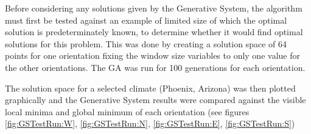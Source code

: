 Before considering any solutions given by the Generative System, the algorithm must first be tested against an example of limited size of which the optimal solution is predeterminately known, to determine whether it would find optimal solutions for this problem. This was done by creating a solution space of 64 points for one orientation fixing the window size variables to only one value for the other orientations. The GA was run for 100 generations for each orientation.

The solution space for a selected climate (Phoenix, Arizona) was then plotted graphically and the Generative System results were compared against the visible local minima and global minimum of each orientation (see figures \ref{fig:GSTestRun:W}, \ref{fig:GSTestRun:N}, \ref{fig:GSTestRun:E}, \ref{fig:GSTestRun:S})

